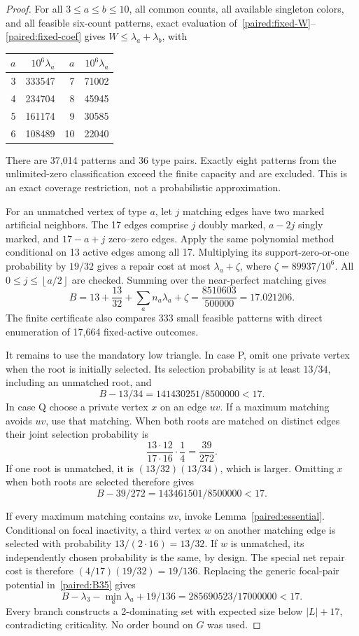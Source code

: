 \documentclass[11pt,a4paper]{article}
\theoremstyle{definition}\newtheorem{definition}[theorem]{Definition}
\theoremstyle{remark}\newtheorem{remark}[theorem]{Remark}
\newcommand{\floor}[1]{\left\lfloor#1\right\rfloor}
\begin{document}
\begin{proof}
For all $3\le a\le b\le10$, all common counts, all available
singleton colors, and all feasible six-count patterns, exact
evaluation of~\eqref{paired:fixed-W}--\eqref{paired:fixed-coef} gives
$W\le\lambda_a+\lambda_b$, with
\begin{center}\small
\begin{tabular}{rr@{\qquad}rr}
\toprule
$a$&$10^6\lambda_a$&$a$&$10^6\lambda_a$\\\midrule
3&333547&7&71002\\
4&234704&8&45945\\
5&161174&9&30585\\
6&108489&10&22040\\\bottomrule
\end{tabular}
\end{center}
There are 37,014 patterns and 36 type pairs. Exactly eight patterns
from the unlimited-zero classification exceed the finite capacity
and are excluded. This is an exact coverage restriction, not a
probabilistic approximation.

For an unmatched vertex of type $a$, let $j$ matching edges have
two marked artificial neighbors. The 17 edges comprise $j$ doubly
marked, $a-2j$ singly marked, and $17-a+j$ zero--zero edges. Apply
the same polynomial method conditional on 13 active edges among
all 17. Multiplying its support-zero-or-one probability by $19/32$
gives a repair cost at most $\lambda_a+\zeta$, where
$\zeta=89937/10^6$. All $0\le j\le\floor{a/2}$ are checked.
Summing over the near-perfect matching gives
\begin{equation}\label{paired:B35}
 B=13+\frac{13}{32}+\sum_a n_a\lambda_a+\zeta
 =\frac{8510603}{500000}=17.021206.
\end{equation}
The finite certificate also compares 333 small feasible patterns
with direct enumeration of 17,664 fixed-active outcomes.

It remains to use the mandatory low triangle. In case P, omit one
private vertex when the root is initially selected. Its selection
probability is at least $13/34$, including an unmatched root, and
\[
 B-13/34=141430251/8500000<17.
\]
In case Q choose a private vertex $x$ on an edge $uv$. If a maximum
matching avoids $uv$, use that matching. When both roots are matched
on distinct edges their joint selection probability is
\[
 \frac{13\cdot12}{17\cdot16}\cdot\frac14=\frac{39}{272}.
\]
If one root is unmatched, it is $(13/32)(13/34)$, which is larger.
Omitting $x$ when both roots are selected therefore gives
\[
 B-39/272=143461501/8500000<17.
\]

If every maximum matching contains $uv$, invoke
Lemma~\ref{paired:essential}. Conditional on focal inactivity, a
third vertex $w$ on another matching edge is selected with probability
$13/(2\cdot16)=13/32$. If $w$ is unmatched, its independently chosen
probability is the same, by design. The special net repair cost is
therefore $(4/17)(19/32)=19/136$. Replacing the generic focal-pair
potential in~\eqref{paired:B35} gives
\[
 B-\lambda_3-\min_a\lambda_a+19/136
   =285690523/17000000<17.
\]
Every branch constructs a 2-dominating set with expected size below
$|L|+17$, contradicting criticality. No order bound on $G$ was used.
\end{proof}
\end{document}
